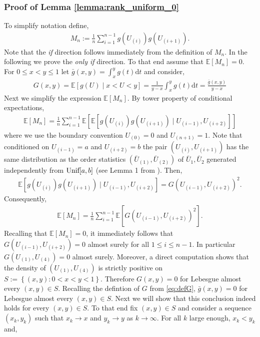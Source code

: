 \documentclass[11pt]{article}
\numberwithin{equation}{section}
\theoremstyle{definition}
\newcommand{\E}{\mathbb{E}}
\newcommand{\ra}{\rightarrow}
\newcommand{\rmd}{\mathrm{d}}
\begin{document}
\subsubsection{Proof of Lemma \ref{lemma:rank_uniform_0}}\label{sec:proofof_lemma_rank_uniform_0}
To simplify notation define,
\begin{align*}
    M_n := \frac{1}{n}\sum_{i=1}^{n-1}
        g\left(U_{(i)}\right)g\left(U_{(i+1)}\right).
\end{align*}
Note that the \textit{if} direction follows immediately from the definition of $M_n$. In the following we prove the \textit{only if} direction. To that end assume that $\E[M_n] = 0$. For $0\leq x<y\leq 1$ let $\bar g(x,y) = \int_{x}^{y}g(t)\rmd t$ and consider,
    \begin{align}\label{eq:defG}
        G(x,y) = \E\left[g(U)\mid x<U<y\right] = \frac{1}{y-x}\int_{x}^{y}g(t)\rmd t = \frac{\bar{g}(x,y)}{y-x}
    \end{align}
    Next we simplify the expression $\E[M_n]$. By tower property of conditional expectations,
    \begin{align*}
        \E[M_n] = \frac{1}{n}\sum_{i=1}^{n-1}\E\left[\E\left[g\left(U_{(i)}\right)g\left(U_{(i+1)}\right)\mid U_{(i-1)}, U_{(i+2)}\right]\right]
    \end{align*}
    where we use the boundary convention $U_{(0)} = 0$ and $U_{(n+1)} = 1$. Note that conditioned on $U_{(i-1)}=a$ and $U_{(i+2)} = b$ the pair $\left(U_{(i)}, U_{(i+1)}\right)$ has the same distribution as the order statistics $\left(\bar{U}_{(1)},\bar{U}_{(2)}\right)$ of $\bar{U}_1,\bar{U}_2$ generated independently from $\textnormal{Unif}[a,b]$ (see Lemma 1 from \cite{gupta2021distribution}). Then,
    \begin{align*}
        \E\left[g\left(U_{(i)}\right)g\left(U_{(i+1)}\right)\mid U_{(i-1)}, U_{(i+2)}\right] = G\left(U_{(i-1)}, U_{(i+2)}\right)^2.
    \end{align*}
    Consequently,
    \begin{align*}
        \E[M_n] = \frac{1}{n}\sum_{i=1}^{n-1}\E\left[G\left(U_{(i-1)}, U_{(i+2)}\right)^2\right].
    \end{align*}
    Recalling that $\E[M_n] = 0$, it immediately follows that $G\left(U_{(i-1)}, U_{(i+2)}\right) = 0$ almost surely for all $1\leq i\leq n-1$. In particular $G\left(U_{(1)}, U_{(4)}\right) = 0$ almost surely. Moreover, a direct computation shows that the density of $\left(U_{(1)}, U_{(4)}\right)$ is strictly positive on $S:=\left\{(x,y): 0< x<y< 1\right\}$. Therefore $G(x,y) = 0$ for Lebesgue almost every $(x,y)\in S$. Recalling the defintion of $G$ from \eqref{eq:defG}, $\bar g(x,y) = 0$ for Lebesgue almost every $(x,y)\in S$. Next we will show that this conclusion indeed holds for every $(x,y)\in S$. To that end fix $(x,y)\in S$ and consider a sequence $(x_k,y_k)$ such that $x_k\ra x$ and $y_k\ra y$ as $k\ra\infty$. For all $k$ large enough, $x_k<y_k$ and,
\end{document}
